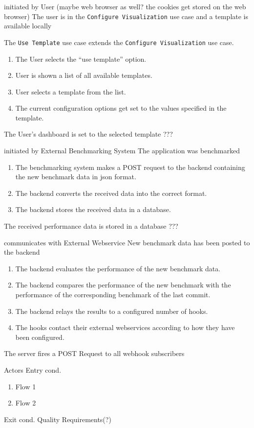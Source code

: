 \bigskip

{initiated by User (maybe web browser as well? the cookies get stored on the web browser)}
{The user is in the \texttt{Configure Visualization} use case and a \gls{template} is available locally}
{The \texttt{Use Template} use case extends the \texttt{Configure Visualization} use case.
\begin{enumerate}
    \item The User selects the \enquote{use template} option.
    \item User is shown a list of all available \glspl{template}.
    \item User selects a \gls{template} from the list.
    \item The current \gls{configuration} options get set to the values specified in the template.
\end{enumerate}} 
{The User's dashboard is set to the selected template}
{???}

\bigskip

{initiated by External Benchmarking System}
{The application was benchmarked}
{\begin{enumerate}
    \item The benchmarking system makes a POST request to the backend containing the new benchmark data in \acrshort{json} format.
    \item The backend converts the received data into the correct format.
    \item The backend stores the received data in a database.
\end{enumerate}} 
{The received performance data is stored in a database}
{???}

\bigskip

{communicates with External Webservice}
{New benchmark data has been posted to the backend}
{\begin{enumerate}
    \item The backend evaluates the performance of the new benchmark data.
    \item The backend compares the performance of the new benchmark with the performance of the corresponding benchmark of the last commit.
    \item The backend relays the results to a configured number of hooks.
    \item The hooks contact their external webservices according to how they have been configured.
\end{enumerate}}
{The server fires a POST Request to all webhook subscribers}
{}

\bigskip

{Actors}
{Entry cond.}
{\begin{enumerate}
    \item Flow 1
    \item Flow 2
\end{enumerate}} 
{Exit cond.}
{Quality Requirements(?)}
